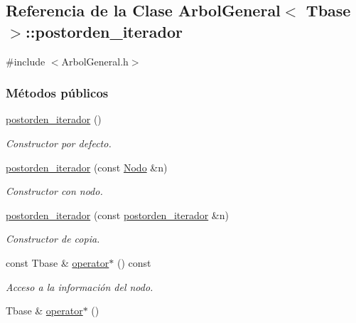 \hypertarget{classArbolGeneral_1_1postorden__iterador}{}\subsection{Referencia de la Clase Arbol\+General$<$ Tbase $>$\+:\+:postorden\+\_\+iterador}
\label{classArbolGeneral_1_1postorden__iterador}


{\ttfamily \#include $<$Arbol\+General.\+h$>$}

\subsubsection*{Métodos públicos}
\begin{DoxyCompactItemize}
\item 
\hyperlink{classArbolGeneral_1_1postorden__iterador_a2ac2dbbaf71087cf7d5964b45b4bca1e}{postorden\+\_\+iterador} ()
\begin{DoxyCompactList}\small\item\em Constructor por defecto. \end{DoxyCompactList}\item 
\hyperlink{classArbolGeneral_1_1postorden__iterador_a40c1929529a5d1063e97c07a73ecb043}{postorden\+\_\+iterador} (const \hyperlink{classArbolGeneral_a12cc1b74a9095d89bc7334290d332f7a}{Nodo} \&n)
\begin{DoxyCompactList}\small\item\em Constructor con nodo. \end{DoxyCompactList}\item 
\hyperlink{classArbolGeneral_1_1postorden__iterador_a07bc1d0276eb14be207144f0a69745d3}{postorden\+\_\+iterador} (const \hyperlink{classArbolGeneral_1_1postorden__iterador}{postorden\+\_\+iterador} \&n)
\begin{DoxyCompactList}\small\item\em Constructor de copia. \end{DoxyCompactList}\item 
const Tbase \& \hyperlink{classArbolGeneral_1_1postorden__iterador_aa42543b192361b8ea90e115a0ed99cab}{operator$\ast$} () const
\begin{DoxyCompactList}\small\item\em Acceso a la información del nodo. \end{DoxyCompactList}\item 
Tbase \& \hyperlink{classArbolGeneral_1_1postorden__iterador_af0f0fcc363dd30b5b0d102c1b60817c3}{operator$\ast$} ()

\end{DoxyCompactItemize}
